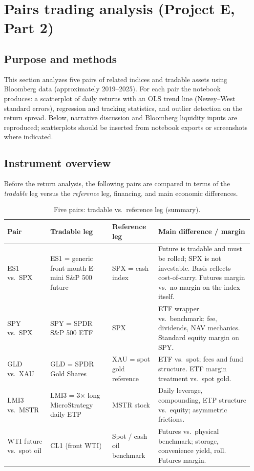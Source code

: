 \documentclass[11pt]{article}
\begin{document}
\section{Pairs trading analysis (Project E, Part 2)}
\label{sec:pairs-trading-project-e}

\subsection{Purpose and methods}
\label{subsec:pairs-purpose}

This section analyzes five pairs of related indices and tradable assets using Bloomberg data (approximately 2019--2025). For each pair the notebook produces: a scatterplot of daily returns with an OLS trend line (Newey--West standard errors), regression and tracking statistics, and outlier detection on the return spread. Below, narrative discussion and Bloomberg liquidity inputs are reproduced; scatterplots should be inserted from notebook exports or screenshots where indicated.

\subsection{Instrument overview}
\label{subsec:pairs-instruments}

Before the return analysis, the following pairs are compared in terms of the \emph{tradable} leg versus the \emph{reference} leg, financing, and main economic differences.

\begin{table}[htbp]
  \centering
  \caption{Five pairs: tradable vs.\ reference leg (summary).}
  \label{tab:pairs-overview}
  \small
  \begin{tabular}{@{}p{} p{} p{} p{}@{}}
    \toprule
    \textbf{Pair} & \textbf{Tradable leg} & \textbf{Reference leg} & \textbf{Main difference / margin} \\
    \midrule
    ES1 vs.\ SPX &
    ES1 = generic front-month E-mini S\&P 500 future &
    SPX = cash index &
    Future is tradable and must be rolled; SPX is not investable. Basis reflects cost-of-carry. Futures margin vs.\ no margin on the index itself. \\
    \addlinespace
    SPY vs.\ SPX &
    SPY = SPDR S\&P 500 ETF &
    SPX &
    ETF wrapper vs.\ benchmark; fee, dividends, NAV mechanics. Standard equity margin on SPY. \\
    \addlinespace
    GLD vs.\ XAU &
    GLD = SPDR Gold Shares &
    XAU = spot gold reference &
    ETF vs.\ spot; fees and fund structure. ETF margin treatment vs.\ spot gold. \\
    \addlinespace
    LMI3 vs.\ MSTR &
    LMI3 = 3$\times$ long MicroStrategy daily ETP &
    MSTR stock &
    Daily leverage, compounding, ETP structure vs.\ equity; asymmetric frictions. \\
    \addlinespace
    WTI future vs.\ spot oil &
    CL1 (front WTI) &
    Spot / cash oil benchmark &
    Futures vs.\ physical benchmark; storage, convenience yield, roll. Futures margin. \\
    \bottomrule
  \end{tabular}
\end{table}
\end{document}
